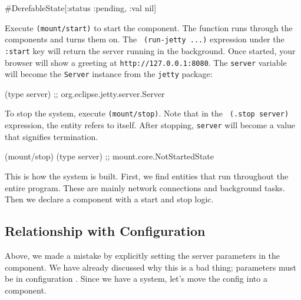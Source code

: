 \else

\begin{english}
  \begin{clojure}
#DerefableState[{:status :pending, :val nil}]
  \end{clojure}
\end{english}

\fi


Execute \texttt{(mount\-/start)} to start the component. The function runs through the components and turns them on. The \verb| (run-jetty ...)| expression under the \verb|:start| key will return the server running in the background. Once started, your browser will show a greeting at \verb|http://127.0.0.1:8080|. The \verb|server| variable will become the \verb|Server| instance from the \verb|jetty| package:

\begin{english}
  \begin{clojure}
(type server)
;; org.eclipse.jetty.server.Server
  \end{clojure}
\end{english}

To stop the system, execute \verb|(mount/stop)|. Note that in the \verb| (.stop server)| expression, the entity refers to itself. After stopping, \verb|server| will become a value that signifies termination.

\begin{english}
  \begin{clojure}
(mount/stop)
(type server)
;; mount.core.NotStartedState
  \end{clojure}
\end{english}

This is how the system is built. First, we find entities that run throughout the entire program. These are mainly network connections and background tasks. Then we declare a component with a start and stop logic.

\subsection{Relationship with Configuration}

Above, we made a mistake by explicitly setting the server parameters in the component. We have already discussed why this is a bad thing; parameters must be in configuration . Since we have a system, let's move the config into a component.


